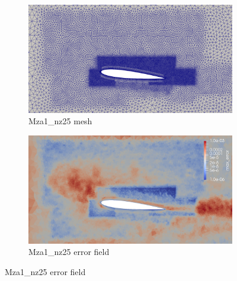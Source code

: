 \begin{figure}[H]
\begin{subfigure}[b]{0.475\textwidth}
	\centering
	\includegraphics[width=1\textwidth]{figures/zonal_adapt_results/Mesh_and_error_plots/Mza1_inplane.png}
	\caption{Mza1\_nz25 mesh}
	\label{fig:zonal_Mza1_mesh}
\end{subfigure}
\begin{subfigure}[b]{0.475\textwidth}
	\centering
	\includegraphics[width=1\textwidth]{figures/zonal_adapt_results/Mesh_and_error_plots/Mza1_error.png}
	\caption{Mza1\_nz25 error field}
	\label{fig:zonal_Mza1_error}
\end{subfigure}



\end{figure}
